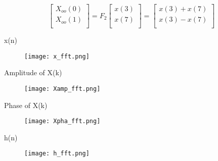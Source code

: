 \documentclass{beamer}
\begin{document}
\begin{frame}
\begin{equation}
\end{equation}
\begin{equation}
\begin{bmatrix}
X_{oo}(0) \\ 
X_{oo}(1)\\ 
\end{bmatrix}
= F_{2}
\begin{bmatrix}
x(3) \\ 
x(7) \\ 
\end{bmatrix}
=
\begin{bmatrix}
x(3)+x(7) \\ 
x(3)-x(7) \\ 
\end{bmatrix}
\end{equation}
\end{frame}

\begin{frame}{x(n)}
\begin{figure}[h!]
    \centering
    \texttt{[image: x\_fft.png]}
    \label{figs}
\end{figure}
\end{frame}


\begin{frame}{Amplitude of X(k)}
\begin{figure}[h!]
    \centering
    \texttt{[image: Xamp\_fft.png]}
    \label{figs}
\end{figure}
\end{frame}

\begin{frame}{Phase of X(k)}
\begin{figure}[h!]
    \centering
    \texttt{[image: Xpha\_fft.png]}
    \label{figs}
\end{figure}
\end{frame}




\begin{frame}{h(n)}
\begin{figure}[h!]
    \centering
    \texttt{[image: h\_fft.png]}
    \label{figs}
\end{figure}
\end{frame}
\end{document}
